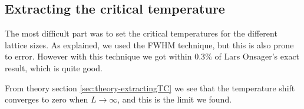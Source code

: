 \documentclass[../main.tex]{subfiles}
\begin{document}
\subsection{Extracting the critical temperature}
The most difficult part was to set the critical temperatures for the different lattice sizes. As explained, we used the FWHM technique, but this is also prone to error. However with this technique we got within $0.3\%$ of Lars Onsager's exact result, which is quite good.

From theory section \ref{sec:theory-extractingTC} we see that the temperature shift converges to zero when $L \rightarrow \infty$, and this is the limit we found.
\end{document}
